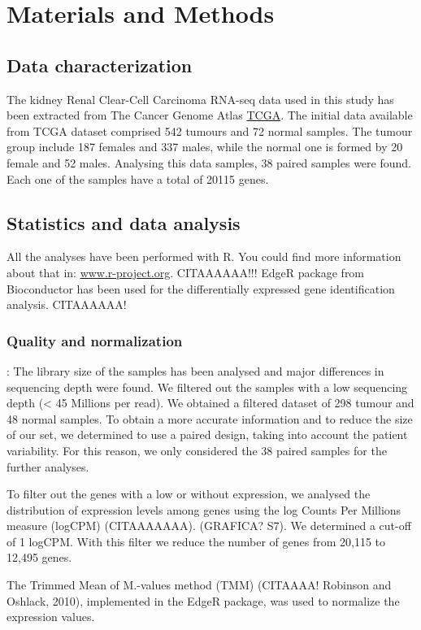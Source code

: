 \documentclass[9pt,twocolumn,twoside]{gsajnl}
\begin{document}
\section*{Materials and Methods}
\subsection*{Data characterization}
The kidney Renal Clear-Cell Carcinoma RNA-seq data used in this study has been extracted from The Cancer Genome Atlas \href{http://www.cancergenome.nih.gov}{TCGA}. The initial data available from TCGA dataset comprised 542 tumours and 72 normal samples. The tumour group include 187 females and 337 males, while the normal one is formed by 20 female and 52 males. Analysing this data samples, 38 paired samples were found. Each one of the samples have a total of 20115 genes. 

\subsection*{Statistics and data analysis}
All the analyses have been performed with R. You could find more information about that in: \url{www.r-project.org}. CITAAAAAA!!! EdgeR package from Bioconductor has been used for the differentially expressed gene identification analysis.  CITAAAAAA!

\subsubsection*{Quality and normalization }
: The library size of the samples has been analysed and major differences in sequencing depth were found. We filtered out the samples with a low sequencing depth (< 45 Millions per read). We obtained a filtered dataset of 298 tumour and 48 normal samples. To obtain a more accurate information and to reduce the size of our set, we determined to use a paired design, taking into account the patient variability. For this reason, we only considered the 38 paired samples for the further analyses.

To filter out the genes with a low or without expression, we analysed the distribution of expression levels among genes using the log Counts Per Millions measure (logCPM) (CITAAAAAAA). (GRAFICA? S7). We determined a cut-off of 1 logCPM. With this filter we reduce the number of genes from 20,115 to 12,495 genes.

The Trimmed Mean of M.-values method (TMM) (CITAAAA! Robinson and Oshlack, 2010), implemented in the EdgeR package, was used to normalize the expression values.
\end{document}
